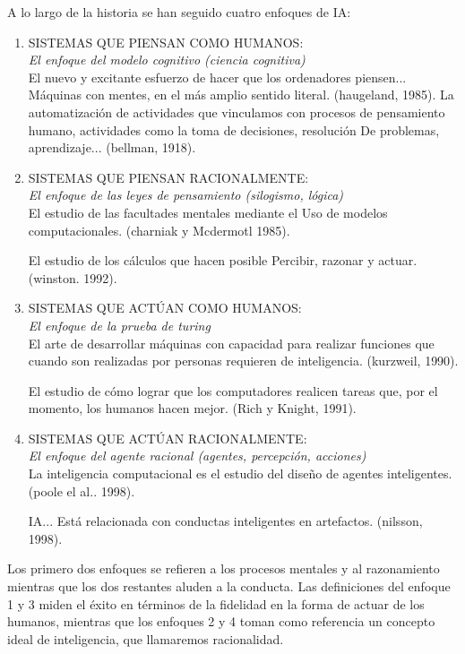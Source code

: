 \documentclass[12pt]{article}
\begin{document}
A lo largo de la historia se han seguido cuatro enfoques de IA:\\
\begin{enumerate}
    \item SISTEMAS QUE PIENSAN COMO HUMANOS:\\
    \textit{El enfoque del modelo cognitivo (ciencia cognitiva)}\\
    El nuevo y excitante esfuerzo de hacer que los ordenadores piensen... Máquinas con mentes, en el más amplio sentido literal. (haugeland,
1985). La automatización de actividades que vinculamos con procesos de pensamiento humano, actividades como la toma de decisiones, resolución
De problemas, aprendizaje... (bellman, 1918).
    \item SISTEMAS QUE PIENSAN RACIONALMENTE:\\
    \textit{El enfoque de las leyes de pensamiento
(silogismo, lógica)}\\
    El estudio de las facultades mentales mediante el
Uso de modelos computacionales. (charniak y
Mcdermotl 1985).

El estudio de los cálculos que hacen posible
Percibir, razonar y actuar. (winston. 1992).
    \item SISTEMAS QUE ACTÚAN COMO HUMANOS:\\
    \textit{El enfoque de la prueba de turing}\\
    El arte de desarrollar máquinas con capacidad para realizar funciones que cuando son realizadas por personas requieren de
inteligencia. (kurzweil, 1990).

El estudio de cómo lograr que los computadores realicen tareas que, por el momento, los humanos hacen mejor. (Rich y
Knight, 1991).
    \item SISTEMAS QUE ACTÚAN RACIONALMENTE:\\
    \textit{El enfoque del agente racional (agentes,
percepción, acciones)}\\
    La inteligencia computacional es el estudio del diseño de agentes inteligentes. (poole el al.. 1998).

IA... Está relacionada con conductas inteligentes en artefactos. (nilsson, 1998).
\end{enumerate}

Los primero dos enfoques se refieren a los procesos mentales y al razonamiento
mientras que los dos restantes aluden a la conducta. Las definiciones del enfoque 1 y 3 miden
el éxito en términos de la fidelidad en la forma de actuar de los humanos, mientras que los enfoques 2 y 4 toman como referencia un concepto ideal de inteligencia, que llamaremos racionalidad.
\end{document}
